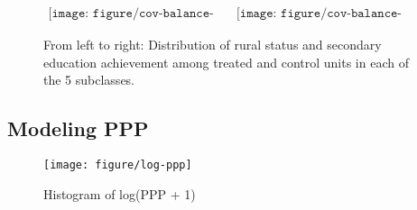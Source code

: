 \documentclass[letterpaper,11pt]{article}
\begin{document}
\begin{figure}[htb]
\begin{centering}
$\begin{array}{cc}
\texttt{[image: figure/cov-balance-uneven-RURALFIN.pdf]} & \texttt{[image: figure/cov-balance-uneven-SECONDARY.pdf]}\end{array}$ 
\par\end{centering}

\protect\caption{From left to right: Distribution of rural status and secondary education achievement
among treated and control units in each of the 5 subclasses.}


\label{fig:cov-uneven2} 
\end{figure}


\clearpage{}


\subsection{Modeling PPP}

\begin{figure}[htb]
\centering \texttt{[image: figure/log-ppp]} \protect\caption{Histogram of log(PPP + 1)}


\label{fig:log-ppp} 
\end{figure}
\end{document}
